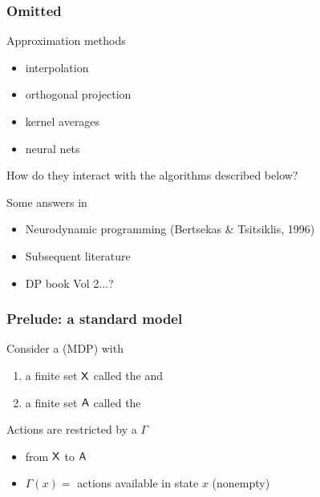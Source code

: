 \documentclass[dvipsnames]{beamer}
\begin{document}
\begin{frame}
    \frametitle{Omitted}

    Approximation methods

    \begin{itemize}
        \item interpolation
            \vspace{0.5em}
        \item orthogonal projection
            \vspace{0.5em}
        \item kernel averages
            \vspace{0.5em}
        \item neural nets
    \end{itemize}



    How do they interact with the algorithms described below?

    Some answers in
    \begin{itemize}
        \item Neurodynamic programming (Bertsekas \& Tsitsiklis, 1996)
            \vspace{0.5em}
        \item Subsequent literature
            \vspace{0.5em}
        \item DP book Vol 2...?
    \end{itemize}
    

\end{frame}


\begin{frame}
    \frametitle{Prelude: a standard model}

    Consider a  (MDP) with
    \begin{enumerate}
        \item a finite set $\mathsf X$ called the  and
        \vspace{0.5em}
        \item a finite set $\mathsf A$ called the 
    \end{enumerate}
     
    \vspace{0.5em}
        \vspace{0.5em}
        \vspace{0.5em}

    Actions are restricted by a  $\Gamma$

    \begin{itemize}
        \vspace{0.5em}
        \item from $\mathsf X$ to $\mathsf A$
        \vspace{0.5em}
        \item $\Gamma(x) =$ actions available in state $x$  (nonempty)
    \end{itemize}

\end{frame}
\end{document}
